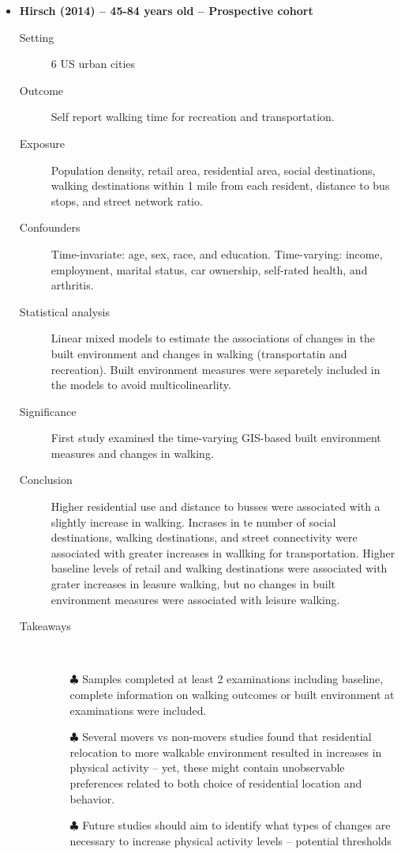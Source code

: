 \documentclass{article}
\begin{document}
\begin{itemize}
\begin{description}
\begin{itemize}
    				\end{itemize}	
		\end{description}

\newpage
	\item{\bf Hirsch (2014) -- 45-84 years old -- Prospective cohort} 
		\begin{description}
			\item[Setting] 6 US urban cities
			\item[Outcome] Self report walking time for recreation and transportation.
			\item[Exposure] Population density, retail area, residential area, social destinations, walking destinations within 1 mile from each resident, distance to bus stops, and street network ratio.
			\item[Confounders] Time-invariate: age, sex, race, and education. Time-varying: income, employment, marital status, car ownership, self-rated health, and arthritis. 
			\item[Statistical analysis] Linear mixed models to estimate the associations of changes in the built environment and changes in walking (transportatin and recreation). Built environment measures were separetely included in the models to avoid multicolinearlity.
			\item[Significance] First study examined the time-varying GIS-based built environment measures and changes in walking.
			\item[Conclusion] Higher residential use and distance to busses were associated with a slightly increase in walking. Incrases in te number of social destinations, walking destinations, and street connectivity were associated with greater increases in wallking for transportation. Higher baseline levels of retail and walking destinations were associated with grater increases in leasure walking, but no changes in built environment measures were associated with leisure walking.
			\item[Takeaways] \mbox{}\\
				\begin{itemize}
					\item[$\clubsuit$] Samples completed at least 2 examinations including baseline, complete information on walking outcomes or built environment at examinations were included.
					\item[$\clubsuit$] Several movers vs non-movers studies found that residential relocation to more walkable environment resulted in increases in physical activity -- yet, these might contain unobservable preferences related to both choice of residential location and behavior.
					\item[$\clubsuit$] Future studies should aim to identify what types of changes are necessary to increase physical activity levels -- potential thresholds
				\end{itemize}
			

\end{description}
\end{itemize}
\end{document}
